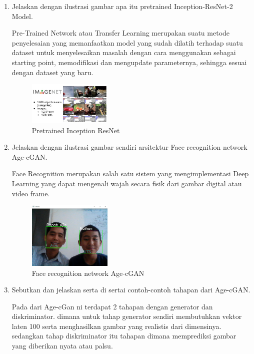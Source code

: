 \begin{enumerate}
        \item Jelaskan dengan ilustrasi gambar apa itu pretrained Inception-ResNet-2 Model.

Pre-Trained Network atau Transfer Learning merupakan suatu metode penyelesaian yang memanfaatkan model yang sudah dilatih terhadap suatu dataset untuk menyelesaikan masalah dengan cara menggunakan sebagai starting point, memodifikasi dan mengupdate parameternya, sehingga sesuai dengan dataset yang baru.

	\begin{figure}[H]
		\includegraphics[width=4cm]{figures/1174087/9/teori6.PNG}
            	\centering
           	\caption{Pretrained Inception ResNet}
       	 \end{figure}

        \item Jelaskan dengan ilustrasi gambar sendiri arsitektur Face recognition network Age-cGAN.

Face Recognition merupakan salah satu sistem yang mengimplementasi Deep Learning yang dapat mengenali wajah secara fisik dari gambar digital atau video frame.

	\begin{figure}[H]
		\includegraphics[width=4cm]{figures/1174087/9/teori7.PNG}
            	\centering
           	 \caption{Face recognition network Age-cGAN}
       	 \end{figure}

        \item Sebutkan dan jelaskan serta di sertai contoh-contoh tahapan dari Age-cGAN.

Pada dari Age-cGan ni terdapat 2 tahapan dengan generator dan diskriminator. dimana untuk tahap generator sendiri membutuhkan vektor laten 100 serta menghasilkan gambar yang realistis dari dimensinya. sedangkan tahap diskriminator itu tahapan dimana memprediksi gambar yang diberikan nyata atau palsu.


\end{enumerate}
